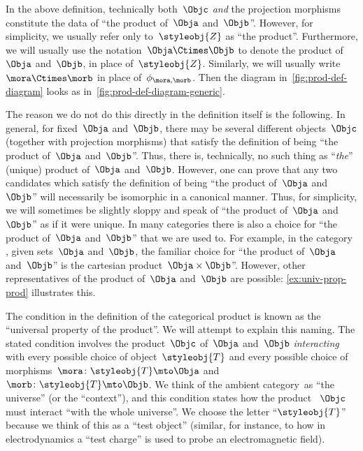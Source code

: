 \begin{marginfigure}
    \centering
    \caption{}
    \label{fig:prod-def-diagram-generic}
\end{marginfigure}

\begin{remark}
    \label{prod unique up to iso}
    In the above definition, technically both~$\Objc$ \emph{and} the projection morphisms constitute the data of ``the product of~$\Obja$ and~$\Objb$''.
    However, for simplicity, we usually refer only to~$\styleobj{Z}$ as ``the product''.
    Furthermore, we will usually use the notation~$\Obja \Ctimes \Objb$ to denote the product of~$\Obja$ and~$\Objb$, in place of~$\styleobj{Z}$.
    Similarly, we will usually write~$\mora \Ctimes \morb$ in place of~$\phi_{\mora, \morb}$.
    Then the diagram in~\cref{fig:prod-def-diagram} looks as in~\cref{fig:prod-def-diagram-generic}.
    
    The reason we do not do this directly in the definition itself is the following.
    In general, for fixed~$\Obja$ and~$\Objb$, there may be several different objects~$\Objc$ (together with projection morphisms) that satisfy the definition of being ``the product of~$\Obja$ and~$\Objb$''.
    Thus, there is, technically, no such thing as ``\emph{the}'' (unique) product of~$\Obja$ and~$\Objb$.
    However, one can prove that any two candidates which satisfy the definition of being ``the product of~$\Obja$ and~$\Objb$'' will necessarily be isomorphic in a canonical manner.
    Thus, for simplicity, we will sometimes be slightly sloppy and speak of ``the product of~$\Obja$ and~$\Objb$'' as if it were unique.
    In many categories there is also a choice for ``the product of~$\Obja$ and~$\Objb$'' that we are used to.
    For example, in the category \Set, given sets~$\Obja$ and~$\Objb$, the familiar choice for ``the product of~$\Obja$ and~$\Objb$'' is the cartesian product~$\Obja \times \Objb$''.
    However, other representatives of the product of~$\Obja$ and~$\Objb$ are possible: \cref{ex:univ-prop-prod} illustrates this.
\end{remark}

\begin{remark}
    The condition in the definition of the categorical product is known as the ``universal property of the product''.
    We will attempt to explain this naming.
    The stated condition involves the product~$\Objc$ of~$\Obja$ and~$\Objb$ \emph{interacting} with every possible choice of object~$\styleobj{T}$ and every possible choice of morphisms~$\mora \colon \styleobj{T} \mto \Obja$ and~$\morb\colon \styleobj{T} \mto \Objb$.
    We think of the ambient category~\CatC as ``the universe'' (or the ``context''), and this condition states how the product ~$\Objc$ must interact ``with the whole universe''.
    We choose the letter ``$\styleobj{T}$'' because we think of this as a ``test object'' (similar, for instance,  to how in electrodynamics a ``test charge'' is used to probe an electromagnetic field).
\end{remark}

